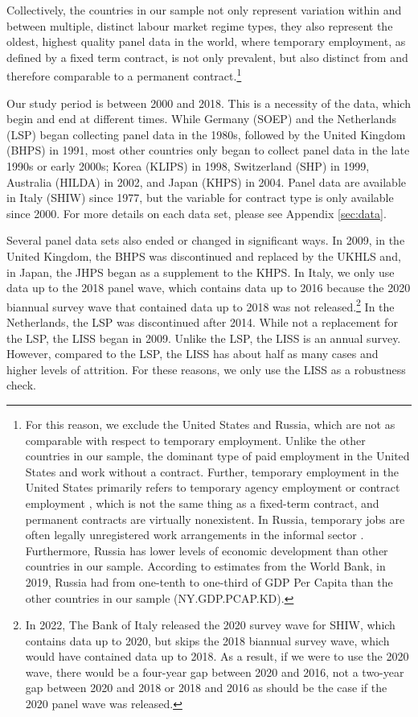 \documentclass[12pt]{article}
\begin{document}
Collectively, the countries in our sample not only represent variation within and between multiple, distinct labour market regime types, they also represent the oldest, highest quality panel data in the world, where temporary employment, as defined by a fixed term contract, is not only prevalent, but also distinct from and therefore comparable to a permanent contract.\footnote{For this reason, we exclude the United States and Russia, which are not as comparable with respect to temporary employment.  Unlike the other countries in our sample, the dominant type of paid employment in the United States and work without a contract.  Further, temporary employment in the United States primarily refers to temporary agency employment or contract employment \citep{kalleberg_nonstandard_2000}, which is not the same thing as a fixed-term contract, and permanent contracts are virtually nonexistent.  In Russia, temporary jobs are often legally unregistered work arrangements in the informal sector \citep{karabchuk_temporary_2012}. Furthermore, Russia has lower levels of economic development than other countries in our sample.  According to estimates from the World Bank, in 2019, Russia had from one-tenth to one-third of GDP Per Capita than the other countries in our sample (NY.GDP.PCAP.KD).} 

Our study period is between 2000 and 2018.  This is a necessity of the data, which begin and end at different times.  While Germany (SOEP) and the Netherlands (LSP) began collecting panel data in the 1980s, followed by the United Kingdom (BHPS) in 1991, most other countries only began to collect panel data in the late 1990s or early 2000s; Korea (KLIPS) in 1998, Switzerland (SHP) in 1999, Australia (HILDA) in 2002, and Japan (KHPS) in 2004.  Panel data are available in Italy (SHIW) since 1977, but the variable for contract type is only available since 2000.  For more details on each data set, please see Appendix \ref{sec:data}.

Several panel data sets also ended or changed in significant ways.  In 2009, in the United Kingdom, the BHPS was discontinued and replaced by the UKHLS and, in Japan, the JHPS began as a supplement to the KHPS. In Italy, we only use data up to the 2018 panel wave, which contains data up to 2016 because the 2020 biannual survey wave that contained data up to 2018 was not released.\footnote{In 2022, The Bank of Italy released the 2020 survey wave for SHIW, which contains data up to 2020, but skips the 2018 biannual survey wave, which would have contained data up to 2018.  As a result, if we were to use the 2020 wave, there would be a four-year gap between 2020 and 2016, not a two-year gap between 2020 and 2018 or 2018 and 2016 as should be the case if the 2020 panel wave was released.}   In the Netherlands, the LSP was discontinued after 2014.  While not a replacement for the LSP, the LISS began in 2009.  Unlike the LSP, the LISS is an annual survey.  However, compared to the LSP, the LISS has about half as many cases and higher levels of attrition.  For these reasons, we only use the LISS as a robustness check.
\end{document}
